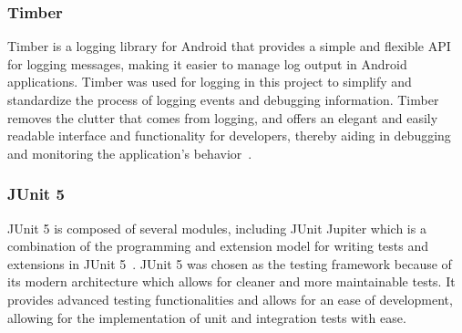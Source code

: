 \subsubsection{Timber}
\label{sec:timber}
Timber is a logging library for Android that provides a simple and flexible API for logging messages, making it easier to manage log output in Android applications. Timber was used for logging in this project to simplify and standardize the process of logging events and debugging information. Timber removes the clutter that comes from logging, and offers an elegant and easily readable interface and functionality for developers, thereby aiding in debugging and monitoring the application’s behavior~\cite{bib:timber}.

\subsubsection{JUnit 5}
\label{sec:junit}
JUnit 5 is composed of several modules, including JUnit Jupiter which is a combination of the programming and extension model for writing tests and extensions in JUnit 5~\cite{bib:junit}. JUnit 5 was chosen as the testing framework because of its modern architecture which allows for cleaner and more maintainable tests. It provides advanced testing functionalities and allows for an ease of development, allowing for the implementation of unit and integration tests with ease.

